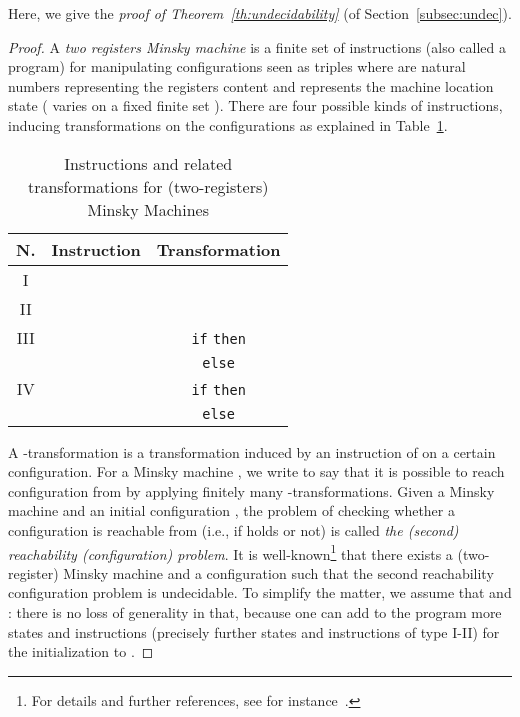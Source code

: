 \documentclass{LMCS}
\theoremstyle{plain}\newtheorem{assumption}[thm]{Assumption}
\theoremstyle{plain}\newtheorem{proposition}[thm]{Proposition}
\theoremstyle{plain}\newtheorem{property}[thm]{Property}
\theoremstyle{plain}\newtheorem{example}[thm]{Example}
\theoremstyle{plain}\newtheorem{claim}[thm]{Claim}
\theoremstyle{plain}\newtheorem{lemma}[thm]{Lemma}
\begin{document}
Here, we give the \emph{proof of Theorem~\ref{th:undecidability}} (of
Section~\ref{subsec:undec}).
\begin{proof}
 A \emph{two registers Minsky machine} is a finite set  of
  instructions (also called a program) for manipulating configurations
  seen as triples  where  are natural numbers
  representing the registers content and  represents the machine
  location state ( varies on a fixed finite set ).  There are
  four possible kinds of instructions, inducing transformations on the
  configurations as explained in Table~\ref{tab:Minsky}.
\begin{table}[ht]
  \begin{center}
  \begin{tabular}{|c|c|c|}
    \hline
N.  & Instruction         & Transformation\\ \hline
    I   &        &  \\ \hline
    II  &        &  \\ \hline
    III &   & {\tt if}  {\tt then}  \\
        &                     & {\tt else}  \hspace{21.5mm} \\ \hline
    IV  &   & {\tt if}  {\tt then}  \\
        &                     & {\tt else}  \hspace{20.5mm} \\
        \hline
   \end{tabular}
   \end{center}
   \caption{\label{tab:Minsky} Instructions and related transformations for (two-registers) Minsky Machines}
\end{table}
A -transformation is a transformation induced by an instruction
of  on a certain configuration.  For a Minsky machine ,
we write  to say
that it is possible to reach configuration  from  by applying finitely many -transformations.  Given a Minsky
machine  and an initial configuration , the
problem of checking whether a configuration  is
reachable from  (i.e., if  holds or not) is called
\emph{the (second) reachability (configuration) problem}.  It is
well-known\footnote{For details and further references, see for
  instance~\cite{CZ}. 
} that there exists a (two-register)
Minsky machine  and a configuration  such that
the second reachability configuration problem is undecidable. To
simplify the matter, we assume that  and : there is no
loss of generality in that, because one can add to the program 
more states and instructions (precisely  further states and
instructions of type I-II) for the initialization to .


\end{proof}
\end{document}
